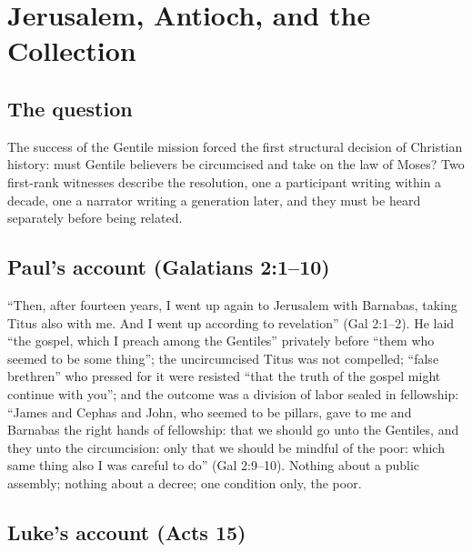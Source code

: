 \section{Jerusalem, Antioch, and the Collection}

\subsection{The question}

The success of the Gentile mission forced the first structural decision of
Christian history: must Gentile believers be circumcised and take on the
law of Moses? Two first-rank witnesses describe the resolution, one a
participant writing within a decade, one a narrator writing a generation
later, and they must be heard separately before being related.

\subsection{Paul's account (Galatians 2:1--10)}

``Then, after fourteen years, I went up again to Jerusalem with Barnabas,
taking Titus also with me. And I went up according to revelation''
(Gal 2:1--2). He laid ``the gospel, which I preach among the Gentiles''
privately before ``them who seemed to be some thing''; the uncircumcised
Titus was not compelled; ``false brethren'' who pressed for it were
resisted ``that the truth of the gospel might continue with you''; and the
outcome was a division of labor sealed in fellowship: ``James and Cephas
and John, who seemed to be pillars, gave to me and Barnabas the right
hands of fellowship: that we should go unto the Gentiles, and they unto
the circumcision: only that we should be mindful of the poor: which same
thing also I was careful to do'' (Gal 2:9--10). Nothing about a public
assembly; nothing about a decree; one condition only, the poor.

\subsection{Luke's account (Acts 15)}

